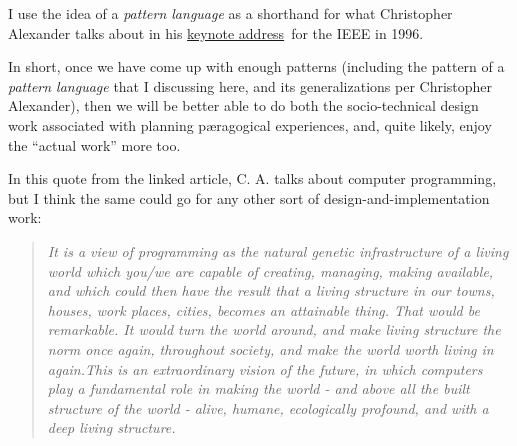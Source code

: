 I use the idea of a \emph{pattern language} as a shorthand for what
Christopher Alexander talks about in his
\href{http://www.patternlanguage.com/archive/ieee/ieeetext.htm}{keynote
address}~for the IEEE in 1996.

In short, once we have come up with enough patterns (including the
pattern of a \emph{pattern language} that I discussing here, and its
generalizations per Christopher Alexander), then we will be better able
to do both the socio-technical design work associated with planning
pæragogical experiences, and, quite likely, enjoy the ``actual work''
more too.

In this quote from the linked article, C. A. talks about computer
programming, but I think the same could go for any other sort of
design-and-implementation work:

\begin{quote}
\emph{It is a view of programming as the natural genetic infrastructure
of a living world which you/we are capable of creating, managing, making
available, and which could then have the result that a living structure
in our towns, houses, work places, cities, becomes an attainable thing.
That would be remarkable. It would turn the world around, and make
living structure the norm once again, throughout society, and make the
world worth living in again.This is an extraordinary vision of the
future, in which computers play a fundamental role in making the world -
and above all the built structure of the world - alive, humane,
ecologically profound, and with a deep living structure.~}
\end{quote}
